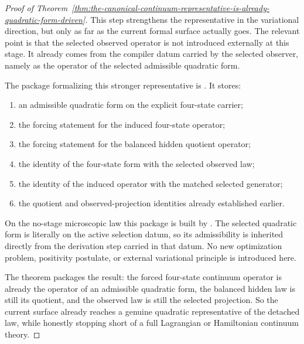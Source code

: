 \begin{proof}[Proof of Theorem~\ref{thm:the-canonical-continuum-representative-is-already-quadratic-form-driven}]
\label{proof:thm:the-canonical-continuum-representative-is-already-quadratic-form-driven}
This step strengthens the representative in the variational direction, but only
as far as the current formal surface actually goes. The relevant point is that
the selected observed operator is not introduced externally at this stage. It
already comes from the compiler datum carried by the selected observer, namely
as the operator of the selected admissible quadratic form.

The package formalizing this stronger representative is
. It stores:
\begin{enumerate}
\item an admissible quadratic form on the explicit four-state carrier;
\item the forcing statement for the induced four-state operator;
\item the forcing statement for the balanced hidden quotient operator;
\item the identity of the four-state form with the selected observed law;
\item the identity of the induced operator with the matched selected
      generator;
\item the quotient and observed-projection identities already established
      earlier.
\end{enumerate}

On the no-stage microscopic law this package is built by
. The
selected quadratic form is literally
 on the active selection datum, so its
admissibility is inherited directly from the derivation step carried in that
datum. No new optimization problem, positivity postulate, or external
variational principle is introduced here.

The theorem
packages the result: the forced four-state continuum operator is already the
operator of an admissible quadratic form, the balanced hidden law is still its
quotient, and the observed law is still the selected projection. So the
current surface already reaches a genuine quadratic representative of the
detached law, while honestly stopping short of a full Lagrangian or
Hamiltonian continuum theory.
\end{proof}

